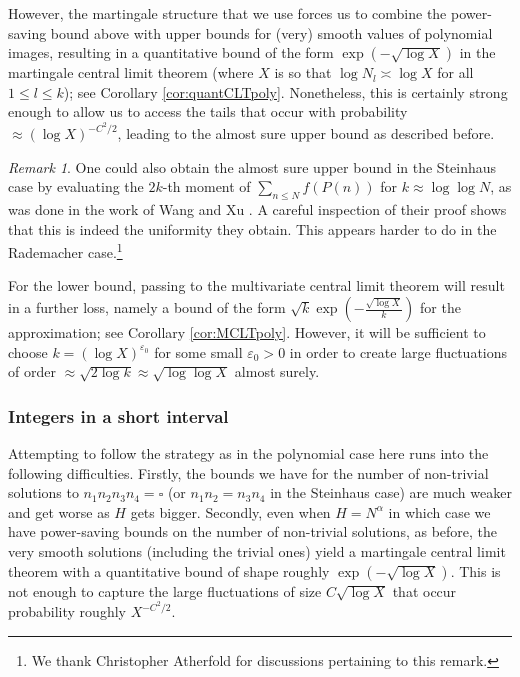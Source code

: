 \documentclass[11pt]{tran-l}
\theoremstyle{definition}
\theoremstyle{remark}
\newtheorem{remark}[theorem]{Remark}
\numberwithin{equation}{section}
\begin{document}
However, the martingale structure that we use forces us to combine the power-saving bound above with upper bounds for (very) smooth values of polynomial images, resulting in a quantitative bound of the form $\exp\left(-\sqrt{\log X}\right)$ in the martingale central limit theorem (where $X$ is so that $\log N_l\asymp \log X$ for all $1\leq l\leq k$); see Corollary \ref{cor:quantCLTpoly}. Nonetheless, this is certainly strong enough to allow us to access the tails that occur with probability $\approx (\log X)^{-C^2/2}$, leading to the almost sure upper bound as described before.

\begin{remark}\label{rmk: wangXumoments} One could also obtain the almost sure upper bound in the Steinhaus case by evaluating the $2k$-th  moment of $\sum_{n\leq N} f(P(n))$ for $k\approx \log\log N$, as was done in the work of Wang and Xu \cite{Wang-Xu}. A careful inspection of their proof shows that this is indeed the uniformity they obtain. This appears harder to do in the Rademacher case.\footnote{We thank Christopher Atherfold for discussions pertaining to this remark.}  \end{remark}

For the lower bound, passing to the multivariate central limit theorem will result in a further loss, namely a bound of the form $\sqrt k\exp\left(-\frac{\sqrt{\log X}}{k}\right)$ for the approximation; see Corollary \ref{cor:MCLTpoly}. However, it will be sufficient to choose $k=(\log X)^{\varepsilon_0}$ for some small $\varepsilon_0>0$ in order to create large fluctuations of order $\approx \sqrt{2\log k}\approx \sqrt{\log\log X}$ almost surely. 

\subsubsection{Integers in a short interval} Attempting to follow the strategy as in the polynomial case here runs into the following difficulties. Firstly, the bounds we have for the number of non-trivial solutions to $n_1n_2n_3n_4=\square$ (or $n_1n_2=n_3n_4$ in the Steinhaus case) are much weaker and get worse as $H$ gets bigger. Secondly, even when $H=N^{\alpha}$ in which case we have power-saving bounds on the number of non-trivial solutions, as before, the very smooth solutions (including the trivial ones) yield a martingale central limit theorem with a quantitative bound of shape roughly $\exp\left(-\sqrt{\log X}\right)$. This is not enough to capture the large fluctuations of size $C\sqrt{\log X}$ that occur probability roughly $X^{-C^2/2}.$ 
\end{document}
